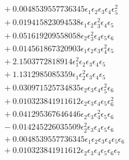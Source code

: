 \documentclass[10pt]{article}
\begin{document}
\begin{align*}
&{}  + 0.0048539557736345 \epsilon_{1} \epsilon_{2} \epsilon_{3} \epsilon_{4} \epsilon_{5}^{2} \\
&{}  + 0.019415823094538 \epsilon_{1} \epsilon_{2} \epsilon_{3}^{2} \epsilon_{4} \epsilon_{5} \\
&{}  + 0.051619209558058 \epsilon_{2} \epsilon_{3}^{2} \epsilon_{4} \epsilon_{5} \epsilon_{6} \\
&{}  + 0.014561867320903 \epsilon_{1} \epsilon_{2} \epsilon_{3} \epsilon_{4}^{2} \epsilon_{5} \\
&{}  + 2.1503772818914 \epsilon_{1}^{2} \epsilon_{2} \epsilon_{3} \epsilon_{4} \epsilon_{5} \\
&{}  + 1.1312985085359 \epsilon_{1} \epsilon_{2}^{2} \epsilon_{3} \epsilon_{4} \epsilon_{5} \\
&{}  + 0.030971525734835 \epsilon_{2} \epsilon_{3} \epsilon_{4} \epsilon_{5}^{2} \epsilon_{6} \\
&{}  + 0.010323841911612 \epsilon_{2} \epsilon_{3} \epsilon_{4} \epsilon_{5} \epsilon_{6}^{2} \\
&{}  + 0.041295367646446 \epsilon_{2} \epsilon_{3} \epsilon_{4}^{2} \epsilon_{5} \epsilon_{6} \\
&{}  - 0.014245226035509 \epsilon_{2}^{2} \epsilon_{3} \epsilon_{4} \epsilon_{5} \epsilon_{6} \\
&{}  + 0.0048539557736345 \epsilon_{1} \epsilon_{2} \epsilon_{3} \epsilon_{4} \epsilon_{5} \epsilon_{6} \\
&{}  + 0.010323841911612 \epsilon_{2} \epsilon_{3} \epsilon_{4} \epsilon_{5} \epsilon_{6} \epsilon_{7}
\end{align*}
\end{document}
